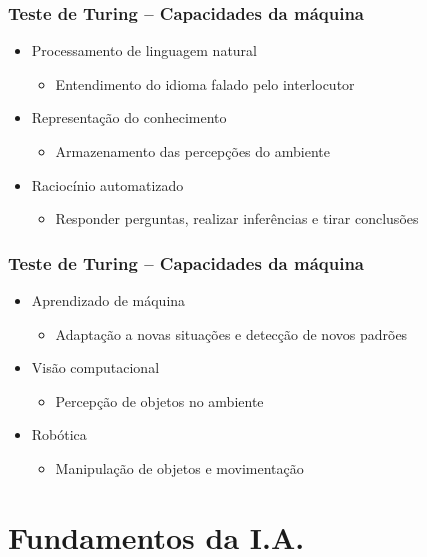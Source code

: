 \documentclass[aspectratio=169]{beamer}
\begin{document}
	\begin{frame}
		\frametitle{Teste de Turing – Capacidades da máquina}
		\begin{itemize}
			\item Processamento de linguagem natural
			\begin{itemize}
				\item Entendimento do idioma falado pelo interlocutor
			\end{itemize}
			\item Representação do conhecimento
			\begin{itemize}
				\item Armazenamento das percepções do ambiente
			\end{itemize}
			\item Raciocínio automatizado
			\begin{itemize}
				\item Responder perguntas, realizar inferências e tirar conclusões
			\end{itemize}

		\end{itemize}
	\end{frame}	

	\begin{frame}
		\frametitle{Teste de Turing – Capacidades da máquina}
		\begin{itemize}
			\item Aprendizado de máquina
			\begin{itemize}
				\item Adaptação a novas situações e detecção de novos padrões
			\end{itemize}
			\item Visão computacional
			\begin{itemize}
				\item Percepção de objetos no ambiente
			\end{itemize}
			\item Robótica
			\begin{itemize}
				\item Manipulação de objetos e movimentação
			\end{itemize}

		\end{itemize}
	\end{frame}	

	\section{Fundamentos da I.A.}
	
\end{document}
